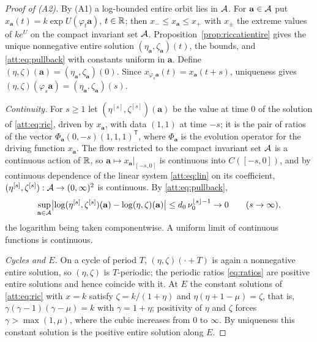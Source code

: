 \begin{proof}[Proof of (A2)]
By (A1) a log-bounded entire orbit lies in $\mathcal A$. For $\mathbf a\in\mathcal A$ put $x_{\mathbf a}(t)=k\exp U(\varphi_t\mathbf a)$, $t\in\mathbb R$; then $x_-\le x_{\mathbf a}\le x_+$ with $x_\pm$ the extreme values of $ke^{U}$ on the compact invariant set $\mathcal A$. Proposition~\ref{prop:riccatientire} gives the unique nonnegative entire solution $(\eta_{\mathbf a},\zeta_{\mathbf a})(t)$, the bounds, and \eqref{att:eq:pullback} with constants uniform in $\mathbf a$. Define $(\eta,\zeta)(\mathbf a)=(\eta_{\mathbf a},\zeta_{\mathbf a})(0)$. Since $x_{\varphi_s\mathbf a}(t)=x_{\mathbf a}(t+s)$, uniqueness gives $(\eta,\zeta)(\varphi_s\mathbf a)=(\eta_{\mathbf a},\zeta_{\mathbf a})(s)$.

\emph{Continuity.} For $s\ge1$ let $(\eta^{[s]},\zeta^{[s]})(\mathbf a)$ be the value at time $0$ of the solution of \eqref{att:eq:ric}, driven by $x_{\mathbf a}$, with data $(1,1)$ at time $-s$; it is the pair of ratios of the vector $\Phi_{\mathbf a}(0,-s)(1,1,1)^{\mathsf T}$, where $\Phi_{\mathbf a}$ is the evolution operator for the driving function $x_{\mathbf a}$. The flow restricted to the compact invariant set $\mathcal A$ is a continuous action of $\mathbb R$, so $\mathbf a\mapsto x_{\mathbf a}|_{[-s,0]}$ is continuous into $C([-s,0])$, and by continuous dependence of the linear system \eqref{att:eq:lin} on its coefficient, $(\eta^{[s]},\zeta^{[s]}):\mathcal A\to(0,\infty)^2$ is continuous. By \eqref{att:eq:pullback},
\[
\sup_{\mathbf a\in\mathcal A}\bigl|\log(\eta^{[s]},\zeta^{[s]})(\mathbf a)-\log(\eta,\zeta)(\mathbf a)\bigr|\le d_0\,\nu_0^{\lfloor s\rfloor-1}\to0\qquad(s\to\infty),
\]
the logarithm being taken componentwise. A uniform limit of continuous functions is continuous.

\emph{Cycles and $E$.} On a cycle of period $T$, $(\eta,\zeta)(\cdot+T)$ is again a nonnegative entire solution, so $(\eta,\zeta)$ is $T$-periodic; the periodic ratios \eqref{eq:ratios} are positive entire solutions and hence coincide with it. At $E$ the constant solutions of \eqref{att:eq:ric} with $x=k$ satisfy $\zeta=k/(1+\eta)$ and $\eta(\eta+1-\mu)=\zeta$, that is, $\gamma(\gamma-1)(\gamma-\mu)=k$ with $\gamma=1+\eta$; positivity of $\eta$ and $\zeta$ forces $\gamma>\max(1,\mu)$, where the cubic increases from $0$ to $\infty$. By uniqueness this constant solution is the positive entire solution along $E$.
\end{proof}

